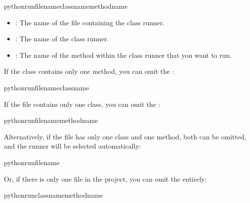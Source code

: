 \documentclass[letterpaper,10pt,english]{sphinxhowto}
\begin{document}
\begin{sphinxVerbatim}[commandchars=\\\{\}]
pythonrunfile\PYGZus{}nameclass\PYGZus{}namemethod\PYGZus{}name
\end{sphinxVerbatim}
\begin{itemize}
\item {} 
\sphinxAtStartPar
{}: The name of the file containing the class runner.

\item {} 
\sphinxAtStartPar
{}: The name of the class runner.

\item {} 
\sphinxAtStartPar
{}: The name of the method within the class runner that you want to run.

\end{itemize}

\sphinxAtStartPar
If the class contains only one method, you can omit the :

\begin{sphinxVerbatim}[commandchars=\\\{\}]
pythonrunfile\PYGZus{}nameclass\PYGZus{}name
\end{sphinxVerbatim}

\sphinxAtStartPar
If the file contains only one class, you can omit the :

\begin{sphinxVerbatim}[commandchars=\\\{\}]
pythonrunfile\PYGZus{}namemethod\PYGZus{}name
\end{sphinxVerbatim}

\sphinxAtStartPar
Alternatively, if the file has only one class and one method, both can be omitted, and the runner will be selected automatically:

\begin{sphinxVerbatim}[commandchars=\\\{\}]
pythonrunfile\PYGZus{}name
\end{sphinxVerbatim}

\sphinxAtStartPar
Or, if there is only one file in the project, you can omit the  entirely:

\begin{sphinxVerbatim}[commandchars=\\\{\}]
pythonrunclass\PYGZus{}namemethod\PYGZus{}name
\end{sphinxVerbatim}
\end{document}
